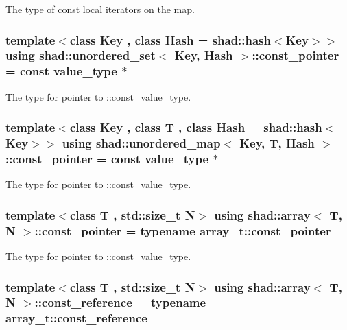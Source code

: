 The type of const local iterators on the map. 

\hypertarget{group__Types_ga3d079442c0e215d47f0c93f05b2ddb1f}{
\subsubsection[{const\-\_\-pointer}]{\setlength{\rightskip}{0pt plus 5cm}template$<$class Key , class Hash  = shad\-::hash$<$\-Key$>$$>$ using {\bf shad\-::unordered\-\_\-set}$<$ Key, Hash $>$\-::const\-\_\-pointer =  const value\-\_\-type $\ast$}}\label{group__Types_ga3d079442c0e215d47f0c93f05b2ddb1f}


The type for pointer to \-::const\-\_\-value\-\_\-type. 

\hypertarget{group__Types_ga4db9d56c27ddb72ccad61249ef55c54c}{
\subsubsection[{const\-\_\-pointer}]{\setlength{\rightskip}{0pt plus 5cm}template$<$class Key , class T , class Hash  = shad\-::hash$<$\-Key$>$$>$ using {\bf shad\-::unordered\-\_\-map}$<$ Key, T, Hash $>$\-::const\-\_\-pointer =  const value\-\_\-type $\ast$}}\label{group__Types_ga4db9d56c27ddb72ccad61249ef55c54c}


The type for pointer to \-::const\-\_\-value\-\_\-type. 

\hypertarget{group__Types_gaf7a2ac6cd741ccfb7bbb1378fbc85218}{
\subsubsection[{const\-\_\-pointer}]{\setlength{\rightskip}{0pt plus 5cm}template$<$class T , std\-::size\-\_\-t N$>$ using {\bf shad\-::array}$<$ T, N $>$\-::const\-\_\-pointer =  typename array\-\_\-t\-::const\-\_\-pointer}}\label{group__Types_gaf7a2ac6cd741ccfb7bbb1378fbc85218}


The type for pointer to \-::const\-\_\-value\-\_\-type. 

\hypertarget{group__Types_gaac06273bdbb48ad582528e12e76bd859}{
\subsubsection[{const\-\_\-reference}]{\setlength{\rightskip}{0pt plus 5cm}template$<$class T , std\-::size\-\_\-t N$>$ using {\bf shad\-::array}$<$ T, N $>$\-::const\-\_\-reference =  typename array\-\_\-t\-::const\-\_\-reference}}\label{group__Types_gaac06273bdbb48ad582528e12e76bd859}


